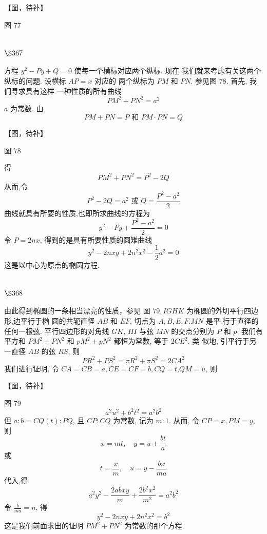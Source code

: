 【图，待补】

图 77

\section{$\S 367$}

方程 $y^{2}-P y+Q=0$ 使每一个横标对应两个纵标. 现在 我们就来考虑有关这两个纵标的问题. 设横标 $A P=x$ 对应的 两个纵标为 $P M$ 和 $P N$. 参见图 78. 首先, 我们寻求具有这样 一种性质的所有曲线
\[
P M^{2}+P N^{2}=a^{2}
\]
$a$ 为常数. 由
\[
P M+P N=P \text { 和 } P M \cdot P N=Q
\]

【图，待补】

图 78

得
\[
P M^{2}+P N^{2}=P^{2}-2 Q
\]
从而,令
\[
P^{2}-2 Q=a^{2} \text { 或 } Q=\frac{P^{2}-a^{2}}{2}
\]
曲线就具有所要的性质,也即所求曲线的方程为
\[
y^{2}-P y+\frac{P^{2}-a^{2}}{2}=0
\]
令 $P=2 n x$, 得到的是具有所要性质的圆雉曲线
\[
y^{2}-2 n x y+2 n^{2} x^{2}-\frac{1}{2} a^{2}=0
\]
这是以中心为原点的椭圆方程.

\section{$\S 368$}

由此得到椭圆的一条相当漂亮的性质，参见 图 $79, I G H K$ 为椭圆的外切平行四边形,边平行于椭 圆的共轭直径 $A B$ 和 $E F$, 切点为 $A, B, E, F . M N$ 是平 行于直径的任何一根弦. 平行四边形的对角线 $G K$, $H I$ 与弦 $M N$ 的交点分别为 $P$ 和 $p$. 我们有平方和 $P M^{2}+P N^{2}$ 和 $p M^{2}+p N^{2}$ 都恒为常数, 等于 $2 C E^{2}$. 类 似地, 引平行于另一直径 $A B$ 的弦 $R S$, 则
\[
P R^{2}+P S^{2}=\pi R^{2}+\pi S^{2}=2 C A^{2}
\]
我们进行证明, 令 $C A=C B=a, C E=C F=b, C Q=t$,$Q M=u$, 则


【图，待补】

图 79 
\[
a^{2} u^{2}+b^{2} t^{2}=a^{2} b^{2}
\]
但 $a: b=C Q(t): P Q$, 且 $C P: C Q$ 为常数, 记为 $m: 1$. 从而, 令 $C P=x, P M=y$, 则
\[
x=m t, \quad y=u+\frac{b t}{a}
\]
或
\[
t=\frac{x}{m}, \quad u=y-\frac{b x}{m a}
\]
代入,得
\[
a^{2} y^{2}-\frac{2 a b x y}{m}+\frac{2 b^{2} x^{2}}{m^{2}}=a^{2} b^{2}
\]
令 $\frac{b}{m a}=n$, 得
\[
y^{2}-2 n x y+2 n^{2} x^{2}=b^{2}
\]
这是我们前面求出的证明 $P M^{2}+P N^{2}$ 为常数的那个方程.

